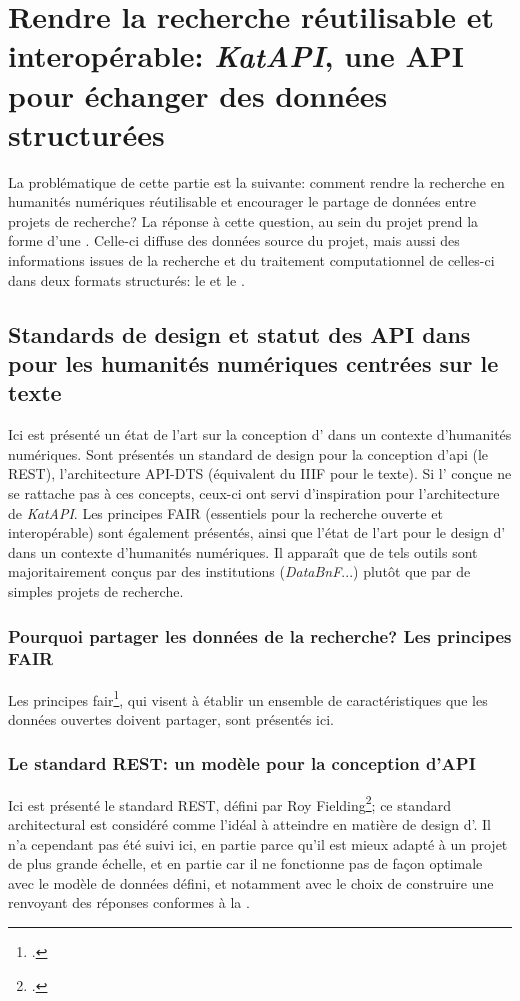 
\part{Rendre la recherche réutilisable et interopérable: \textit{KatAPI}, une API pour échanger des données structurées}

La problématique de cette partie est la suivante: comment rendre la recherche en humanités numériques réutilisable et encourager le partage de données entre projets de recherche? La réponse à cette question, au sein du projet \mssktb{} prend la forme d'une \api{}. Celle-ci diffuse des données source du projet, mais aussi des informations issues de la recherche et du traitement computationnel de celles-ci dans deux formats structurés: le \json{} et le \xmltei{}.

\chapter{Standards de design et statut des API dans pour les humanités numériques centrées sur le texte}
Ici est présenté un état de l'art sur la conception d'\api{} dans un contexte d'humanités numériques. Sont présentés un standard de design pour la conception d'api (le REST), l'architecture API-DTS (équivalent du IIIF pour le texte). Si l'\api{} conçue ne se rattache pas à ces concepts, ceux-ci ont servi d'inspiration pour l'architecture de \textit{KatAPI}. Les principes FAIR (essentiels pour la recherche ouverte et interopérable) sont également présentés, ainsi que l'état de l'art pour le design d'\api{} dans un contexte d'humanités numériques. Il apparaît que de tels outils sont majoritairement conçus par des institutions (\textit{DataBnF}...) plutôt que par de simples projets de recherche.

\section{Pourquoi partager les données de la recherche? Les principes FAIR}
Les principes \gls{fair}\footcite{boeckhout_fair_2018}, qui visent à établir un ensemble de caractéristiques que les données ouvertes doivent partager, sont présentés ici.

\section{Le standard REST: un modèle pour la conception d'API}
Ici est présenté le standard REST, défini par Roy Fielding\footcite{fielding_architectural_2000}; ce standard architectural est considéré comme l'idéal à atteindre en matière de design d'\api{}. Il n'a cependant pas été suivi ici, en partie parce qu'il est mieux adapté à un projet de plus grande échelle, et en partie car il ne fonctionne pas de façon optimale avec le modèle de données défini, et notamment avec le choix de construire une \api{} renvoyant des réponses conformes à la \tei{}.

